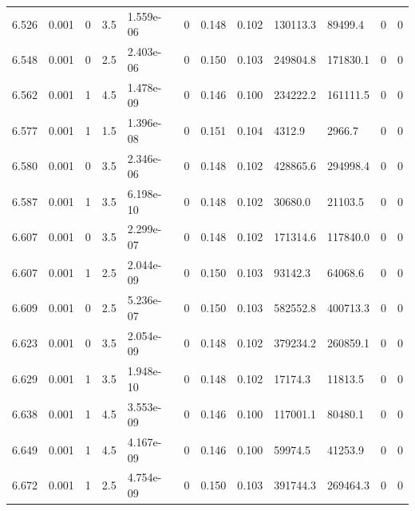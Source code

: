 \documentclass[preview]{standalone}
\begin{document}
{{{{{{{{{{{{{{{\begin{tabular}{L{1.2cm}C{1.2cm} C{0.3cm}C{0.5cm} C{1.4cm}C{1.4cm} C{1.4cm}C{1.4cm} C{1.6cm}C{1.6cm} C{1.6cm}C{1.6cm}}
  6.526  &  0.001  & 0     & 3.5 &  1.559e-06  & 0  &  0.148&   0.102& 130113.3 & 89499.4   &  0 & 0  \\ 
  6.548  &  0.001  & 0     & 2.5 &  2.403e-06  & 0  &  0.150&   0.103& 249804.8 & 171830.1   &  0 & 0  \\ 
  6.562  &  0.001  & 1     & 4.5 &  1.478e-09  & 0  &  0.146&   0.100& 234222.2 & 161111.5   &  0 & 0  \\ 
  6.577  &  0.001  & 1     & 1.5 &  1.396e-08  & 0  &  0.151&   0.104& 4312.9 & 2966.7   &  0 & 0  \\ 
  6.580  &  0.001  & 0     & 3.5 &  2.346e-06  & 0  &  0.148&   0.102& 428865.6 & 294998.4   &  0 & 0  \\ 
  6.587  &  0.001  & 1     & 3.5 &  6.198e-10  & 0  &  0.148&   0.102& 30680.0 & 21103.5   &  0 & 0  \\ 
  6.607  &  0.001  & 0     & 3.5 &  2.299e-07  & 0  &  0.148&   0.102& 171314.6 & 117840.0   &  0 & 0  \\ 
  6.607  &  0.001  & 1     & 2.5 &  2.044e-09  & 0  &  0.150&   0.103& 93142.3 & 64068.6   &  0 & 0  \\ 
  6.609  &  0.001  & 0     & 2.5 &  5.236e-07  & 0  &  0.150&   0.103& 582552.8 & 400713.3   &  0 & 0  \\ 
  6.623  &  0.001  & 0     & 3.5 &  2.054e-09  & 0  &  0.148&   0.102& 379234.2 & 260859.1   &  0 & 0  \\ 
  6.629  &  0.001  & 1     & 3.5 &  1.948e-10  & 0  &  0.148&   0.102& 17174.3 & 11813.5   &  0 & 0  \\ 
  6.638  &  0.001  & 1     & 4.5 &  3.553e-09  & 0  &  0.146&   0.100& 117001.1 & 80480.1   &  0 & 0  \\ 
  6.649  &  0.001  & 1     & 4.5 &  4.167e-09  & 0  &  0.146&   0.100& 59974.5 & 41253.9   &  0 & 0  \\ 
  6.672  &  0.001  & 1     & 2.5 &  4.754e-09  & 0  &  0.150&   0.103& 391744.3 & 269464.3   &  0 & 0  \\ 
\hline 
\end{tabular} 

}}}}}}}}}}}}}}}
\end{document}
